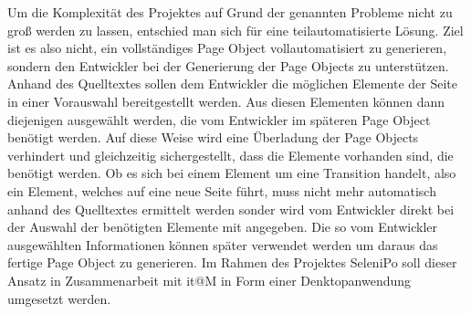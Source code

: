 Um die Komplexität des Projektes auf Grund der genannten Probleme nicht zu groß werden zu lassen, entschied man sich für eine teilautomatisierte Lösung.
Ziel ist es also nicht, ein vollständiges Page Object vollautomatisiert zu generieren, sondern den Entwickler bei der Generierung der Page Objects zu unterstützen. Anhand des Quelltextes sollen dem Entwickler die möglichen Elemente der Seite in einer Vorauswahl bereitgestellt werden. Aus diesen Elementen können dann diejenigen ausgewählt werden, die vom Entwickler im späteren Page Object benötigt werden. Auf diese Weise wird eine Überladung der Page Objects verhindert und gleichzeitig sichergestellt, dass die Elemente vorhanden sind, die benötigt werden.
Ob es sich bei einem Element um eine Transition handelt, also ein Element, welches auf eine neue Seite führt, muss nicht mehr automatisch anhand des Quelltextes ermittelt werden sonder wird vom Entwickler direkt bei der Auswahl der benötigten Elemente mit angegeben.
Die so vom Entwickler ausgewählten Informationen können später verwendet werden um daraus das fertige Page Object zu generieren.
Im Rahmen des Projektes SeleniPo soll dieser Ansatz in Zusammenarbeit mit it@M in Form einer Denktopanwendung umgesetzt werden. 

